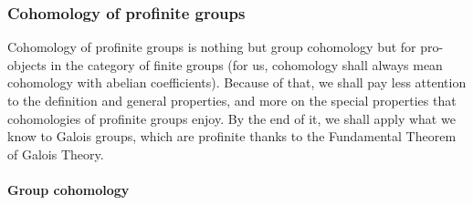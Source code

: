             \subsubsection{Cohomology of profinite groups}
                Cohomology of profinite groups is nothing but group cohomology but for pro-objects in the category of finite groups (for us, cohomology shall always mean cohomology with abelian coefficients). Because of that, we shall pay less attention to the definition and general properties, and more on the special properties that cohomologies of profinite groups enjoy. By the end of it, we shall apply what we know to Galois groups, which are profinite thanks to the Fundamental Theorem of Galois Theory. 
                
                \paragraph{Group cohomology}
